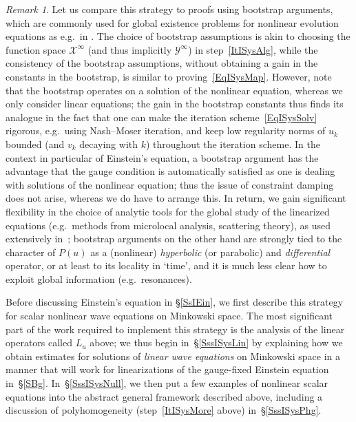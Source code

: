 \documentclass[reqno,11pt,letterpaper]{amsart}
\numberwithin{equation}{section}
\numberwithin{figure}{section}
\theoremstyle{definition}
\theoremstyle{remark}
\newtheorem{rmk}[thm]{Remark}
\newcommand{\mc}{\mathcal}
\newcommand{\cX}{\mc X}
\newcommand{\cY}{\mc Y}
\begin{document}
\begin{rmk}
\label{RmkIItVsBoot}
  Let us compare this strategy to proofs using bootstrap arguments, which are commonly used for global existence problems for nonlinear evolution equations as e.g.\ in \cite{ChristodoulouKlainermanStability,LindbladRodnianskiGlobalStability,LukKerrNonlinear}. The choice of bootstrap assumptions is akin to choosing the function space $\cX^\infty$ (and thus implicitly $\cY^\infty$) in step~\ref{ItISysAlg}, while the consistency of the bootstrap assumptions, without obtaining a gain in the constants in the bootstrap, is similar to proving~\eqref{EqISysMap}. However, note that the bootstrap operates on a solution of the nonlinear equation, whereas we only consider linear equations; the gain in the bootstrap constants thus finds its analogue in the fact that one can make the iteration scheme~\eqref{EqISysSolv} rigorous, e.g.\ using Nash--Moser iteration, and keep low regularity norms of $u_k$ bounded (and $v_k$ decaying with $k$) throughout the iteration scheme. In the context in particular of Einstein's equation, a bootstrap argument has the advantage that the gauge condition is automatically satisfied as one is dealing with solutions of the nonlinear equation; thus the issue of constraint damping does not arise, whereas we do have to arrange this. In return, we gain significant flexibility in the choice of analytic tools for the global study of the linearized equations (e.g.\ methods from microlocal analysis, scattering theory), as used extensively in~\cite{HintzVasyKdSStability}; bootstrap arguments on the other hand are strongly tied to the character of $P(u)$ as a (nonlinear) \emph{hyperbolic} (or parabolic) and \emph{differential} operator, or at least to its locality in `time', and it is much less clear how to exploit global information (e.g.\ resonances).
\end{rmk}

Before discussing Einstein's equation in \S\ref{SsIEin}, we first describe this strategy for scalar nonlinear wave equations on Minkowski space. The most significant part of the work required to implement this strategy is the analysis of the linear operators called $L_u$ above; we thus begin in~\S\ref{SssISysLin} by explaining how we obtain estimates for solutions of \emph{linear wave equations} on Minkowski space in a manner that will work for linearizations of the gauge-fixed Einstein equation in~\S\ref{SBg}. In~\S\ref{SssISysNull}, we then put a few examples of nonlinear scalar equations into the abstract general framework described above, including a discussion of polyhomogeneity (step~\ref{ItISysMore} above) in~\S\ref{SssISysPhg}.
\end{document}
